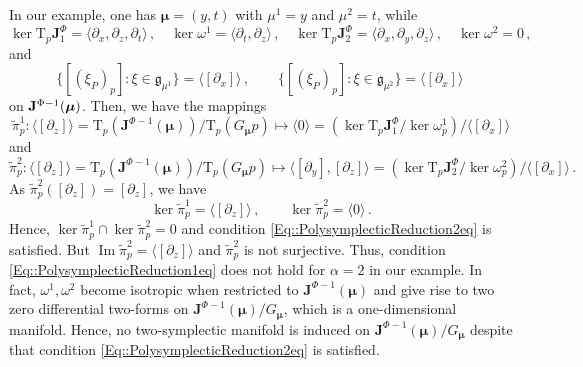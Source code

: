 \documentclass[11pt]{article}
\theoremstyle{plain}
\theoremstyle{definition}
\newcommand{\T}{\mathrm{T}}
\DeclareMathOperator{\Ima}{Im}
\numberwithin{equation}{section}
\begin{document}
In our example, one has $\bm\mu=(y,t)$ with $\mu^1=y$ and $\mu^2=t$, while
$$
    \ker \T_p\mathbf{J}^\Phi_1 = \langle \partial_x,\partial_z,\partial_t\rangle\,,\quad \ker \omega^1=\langle \partial_t,\partial_z\rangle\,,\quad \ker \T_p\mathbf{J}^\Phi_2 = \langle \partial_x,\partial_y,\partial_z\rangle\,,\quad \ker \omega^2 = 0\,,
$$
and
$$
    \{ [(\xi_P)_p]:\xi\in \mathfrak{g}_{\mu^1}\}=\langle [\partial_x]\rangle\,,\qquad \{ [(\xi_P)_p]:\xi\in \mathfrak{g}_{\mu^2}\}=\langle [\partial_x]\rangle\,
$$
on ${\bf J}^{\Phi-1}(\bm\mu)$. Then, we have the mappings
$$
    \widetilde{\pi}_p^1:\langle [\partial_z]\rangle = \T_p(\mathbf{J}^{\Phi-1}(\bm\mu))/\T_p(G_{\bm\mu} p)\longmapsto \langle 0\rangle= (\ker \T_p\mathbf{J}^\Phi_1/\ker \omega_p^1)/\langle [\partial_x]\rangle
$$
and
$$
    \widetilde{\pi}_p^2:\langle [\partial_z]\rangle = \T_p(\mathbf{J}^{\Phi-1}(\bm\mu))/\T_p(G_{\bm\mu} p)\longmapsto \langle [\partial_y],[\partial_z]\rangle=(\ker \T_p\mathbf{J}^\Phi_2/\ker \omega_p^2)/\langle [\partial_x]\rangle\,.
$$
As $\widetilde{\pi}_p^2([\partial_z])=[\partial_z]$, we have
$$
    \ker \widetilde{\pi}_p^1=\langle [\partial_z]\rangle\,,\qquad \ker \widetilde{\pi}_p^2=\langle 0\rangle\,.
$$
Hence, $\ker\widetilde{\pi}_p^1\cap \ker \widetilde{\pi}_p^2 = 0$ and condition \eqref{Eq::PolysymplecticReduction2eq} is satisfied. But $\Ima\widetilde{\pi}_p^2=\langle [\partial_z]\rangle$ and $\widetilde{\pi}_p^2$ is not surjective. Thus, condition \eqref{Eq::PolysymplecticReduction1eq} does not hold for $\alpha=2$ in our example. In fact, $\omega^1,\omega^2$ become isotropic when restricted to $\mathbf{J}^{\Phi-1}(\bm\mu)$ and give rise to two zero differential two-forms on $\mathbf{J}^{\Phi-1}(\bm\mu)/G_{\bm\mu}$, which is a one-dimensional manifold. Hence, no two-symplectic manifold is induced on $\mathbf{J}^{\Phi-1}(\bm\mu)/G_{\bm\mu}$ despite that condition \eqref{Eq::PolysymplecticReduction2eq} is satisfied.
\end{document}
